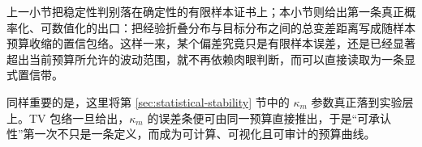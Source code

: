 上一小节把稳定性判别落在确定性的有限样本证书上；本小节则给出第一条真正概率化、可数值化的出口：把经验折叠分布与目标分布之间的总变差距离写成随样本预算收缩的置信包络。这样一来，某个偏差究竟只是有限样本误差，还是已经显著超出当前预算所允许的波动范围，就不再依赖肉眼判断，而可以直接读取为一条显式置信带。

同样重要的是，这里将第 \ref{sec:statistical-stability} 节中的 \(\kappa_m\) 参数真正落到实验层上。TV 包络一旦给出，\(\kappa_m\) 的误差条便可由同一预算直接推出，于是“可承认性”第一次不只是一条定义，而成为可计算、可视化且可审计的预算曲线。
